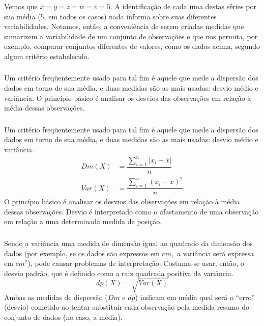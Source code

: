 \documentclass[14pt,aspectratio=1610]{beamer}
\begin{document}
\begin{frame}{}
\frametitle{}
\begin{block}{}
\justifying
Vemos que $\bar{x}=\bar{y}=\bar{z}=\bar{w}=\bar{v}=5$. A identificação de cada uma destas séries por sua
média (5, em todos os casos) nada informa sobre suas diferentes variabilidades. Notamos, então, a conveniência de serem criadas medidas que sumarizem a variabilidade de um conjunto de observações e que nos permita, por exemplo, comparar conjuntos diferentes de valores, como os dados acima, segundo algum critério estabelecido.
\end{block}
\end{frame}

\begin{frame}{}
\frametitle{}
\begin{block}{}
\justifying
Um critério freqüentemente usado para tal fim é aquele que mede a dispersão dos
dados em torno de sua média, e duas medidas são as mais usadas: desvio médio e variância.
O princípio básico é analisar os desvios das observações em relação à média dessas
observações.
\end{block}
\end{frame}

\begin{frame}{}
\frametitle{}
\begin{block}{}
\justifying
Um critério freqüentemente usado para tal fim é aquele que mede a dispersão dos
dados em torno de sua média, e duas medidas são as mais usadas: desvio médio e variância.
\begin{align}
Dm(X) &=\displaystyle \dfrac{\sum_{i=1}^{n}|x_{i}-\bar{x}|}{n}\\
Var(X)&=\displaystyle \dfrac{\sum_{i=1}^{n}(x_{i}-\bar{x})^{2}}{n}
\end{align}
O princípio básico é analisar os desvios das observações em relação à média dessas observações. Desvio é interpretado como o afastamento de uma observação em relação a uma determinada medida de posição.
\end{block}
\end{frame}

\begin{frame}{}
\frametitle{}
\begin{block}{}
\justifying
Sendo a variância uma medida de dimensão igual ao quadrado da dimensão dos dados (por exemplo, se os dados são expressos em $cm,$ a variância será expressa em $cm^{2}$), pode causar problemas de interpretação. Costuma-se usar, então, o desvio padrão, que é definido como a raiz quadrada positiva da variância.
\begin{equation}
dp(X)=\sqrt{Var(X)}
\end{equation}
Ambas as medidas de dispersão ($Dm$ e $dp$) indicam em média qual será o “erro” (desvio)
cometido ao tentar substituir cada observação pela medida resumo do conjunto de dados
(no caso, a média).
\end{block}
\end{frame}
\end{document}
